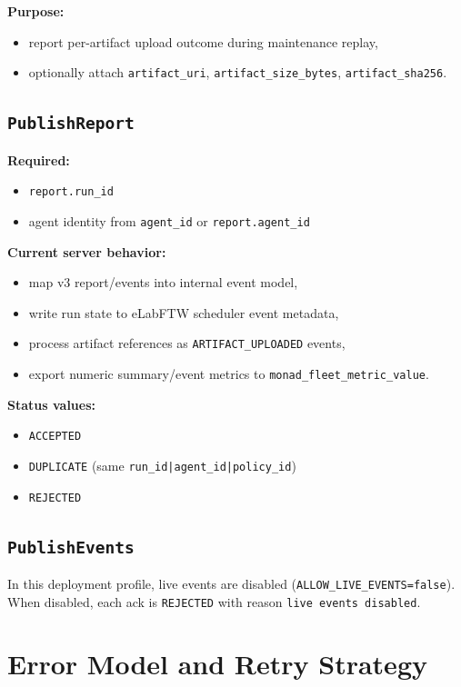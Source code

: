\documentclass[11pt,a4paper]{article}
\begin{document}
\textbf{Purpose:}
\begin{itemize}
  \item report per-artifact upload outcome during maintenance replay,
  \item optionally attach \texttt{artifact\_uri}, \texttt{artifact\_size\_bytes}, \texttt{artifact\_sha256}.
\end{itemize}

\subsection{\texttt{PublishReport}}
\textbf{Required:}
\begin{itemize}
  \item \texttt{report.run\_id}
  \item agent identity from \texttt{agent\_id} or \texttt{report.agent\_id}
\end{itemize}

\textbf{Current server behavior:}
\begin{itemize}
  \item map v3 report/events into internal event model,
  \item write run state to eLabFTW scheduler event metadata,
  \item process artifact references as \texttt{ARTIFACT\_UPLOADED} events,
  \item export numeric summary/event metrics to \texttt{monad\_fleet\_metric\_value}.
\end{itemize}

\textbf{Status values:}
\begin{itemize}
  \item \texttt{ACCEPTED}
  \item \texttt{DUPLICATE} (same \texttt{run\_id|agent\_id|policy\_id})
  \item \texttt{REJECTED}
\end{itemize}

\subsection{\texttt{PublishEvents}}
In this deployment profile, live events are disabled (\texttt{ALLOW\_LIVE\_EVENTS=false}).
When disabled, each ack is \texttt{REJECTED} with reason \texttt{live events disabled}.

\section{Error Model and Retry Strategy}
\end{document}
